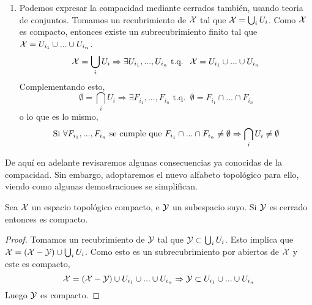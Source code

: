 \begin{obs}
\begin{enumerate}
\begin{proof}
\begin{enumerate}
				\item[\bla] Sea $\A'=\{A'_{i}\}$ un cubrimiento de $\Y$ por abiertos de $\Y$. Para cada $i$ podemos elegir un conjunto $A_i$ abierto en $\X$ tal que 
					\begin{equation*}
							\A'_i=A_i \cap \Y
					\end{equation*}
					La colección formada por estos $A_i$ a la que llamaremos $\A$ es un recubrimiento de $\Y$ por abiertos de $\A$. Por hipótesis, existe algun subrecubrimiento finito $\{A_{i_1},...,A_{i_n}\}$ que cubre $\Y$. Entonces $\{A'_{i_1},...,A'_{i_n}\}$ es una subrecubrimiento finito de $\Y$, luego $\Y$ es compacto. \qedhere
			\end{enumerate}
		\end{proof}
		\item Podemos expresar la compacidad mediante cerrados también, usando teoria de conjuntos.
		Tomamos un recubrimiento de $\X$ tal que $\mathcal{X} = \bigcup_{i}U_i$. Como $\X$ es compacto, entonces existe un subrecubrimiento finito tal que $\mathcal{X} = U_{i_1} \cup ... \cup U_{i_n}$.
		\begin{equation*}
			\mathcal{X} = \bigcup_{i}U_i \Rightarrow \exists U_{i_1},..., U_{i_n} \text{ t.q. }\ \mathcal{X} = U_{i_1} \cup ... \cup U_{i_n}
		\end{equation*}
		Complementando esto,
		\begin{equation*}
			\emptyset = \bigcap_{i}U_i \Rightarrow \exists F_{i_1},..., F_{i_n} \text{ t.q. }\ \emptyset = F_{i_1} \cap ... \cap F_{i_n}
		\end{equation*}
		o lo que es lo mismo,
		\begin{equation*}
			 \text{Si } \forall F_{i_1},..., F_{i_n} \text{ se cumple que } F_{i_1} \cap ... \cap F_{i_n} \neq \emptyset  \Rightarrow \bigcap_{i}U_i \neq \emptyset	\qedhere
		\end{equation*}
	\end{enumerate}
\end{obs}

De aquí en adelante revisaremos algunas consecuencias ya conocidas de la compacidad. Sin embargo, adoptaremos el nuevo alfabeto topológico para ello, viendo como algunas demostraciones se simplifican.

\begin{prop}\label{T6:prop_cerrado en compacto es compacto}
	\label{cerra_en_comp_comp}
	Sea $\X$ un espacio topológico compacto, e $\Y$ un subespacio suyo. Si $\Y$ es cerrado entonces es compacto.
	\begin{proof}
		Tomamos un recubrimiento de $\Y$ tal que $\mathcal{Y} \subset \bigcup_{i}U_i$. Esto implica que $\mathcal{X} = (\mathcal{X}-\mathcal{Y}) \cup \bigcup_{i}U_i$. Como esto es un subrecubrimiento por abiertos de $\X$ y este es compacto,
		\begin{equation*}
			\mathcal{X} = (\mathcal{X}-\mathcal{Y}) \cup U_{i_1} \cup ... \cup U_{i_n} \Rightarrow \mathcal{Y} \subset U_{i_1} \cup ... \cup U_{i_n}
		\end{equation*}
		Luego $\Y$ es compacto.
	\end{proof}
\end{prop}


